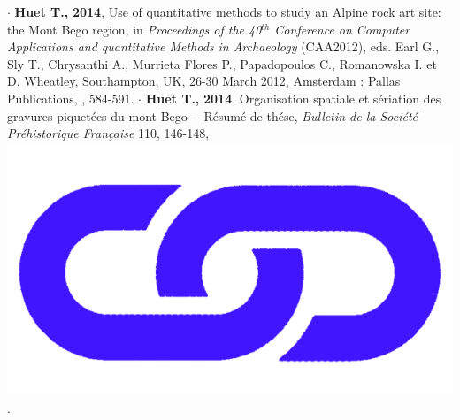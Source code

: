 \documentclass{article}
\begin{document}
\smallbreak
$\cdot$ \textbf{Huet T.,} \textbf{2014}, Use of quantitative methods to study an Alpine rock art site: the Mont Bego region, in \textit{Proceedings of the 40${}^{th}$ Conference on Computer Applications and quantitative Methods in Archaeology} (CAA2012), eds. Earl G., Sly T., Chrysanthi A., Murrieta Flores P., Papadopoulos C., Romanowska I. et D. Wheatley, Southampton, UK, 26-30 March 2012, Amsterdam : Pallas Publications, , 584-591.
\smallbreak
$\cdot$ \textbf{Huet T.,} \textbf{2014}, Organisation spatiale et s\'{e}riation des gravures piquet\'{e}es du mont Bego~-- R\'{e}sum\'{e} de th\'{e}se, \textit{Bulletin de la Soci\'{e}t\'{e} Pr\'{e}historique Fran\c{c}aise} 110, 146-148, \href{https://www.persee.fr/doc/bspf_0249-7638_2013_num_110_1_14242}{\includegraphics[scale=0.02]{link_darkblue.png}}.
\end{document}
